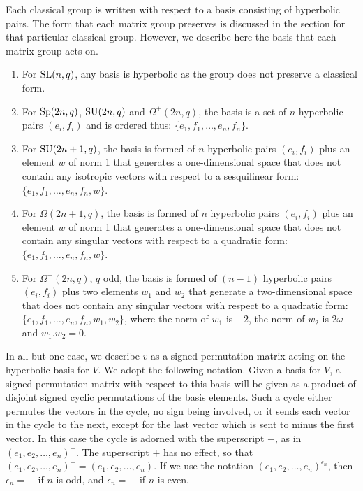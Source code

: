 \documentclass[12pt]{report}
\def\SL{{\rm SL}}
\def\Sp{{\rm Sp}}
\def\SU{{\rm SU}}
\begin{document}
Each classical group is written with respect to a basis consisting of hyperbolic pairs. The form that each matrix group preserves is discussed in the section for that particular classical group. However, we describe here the basis that each matrix group acts on.

\begin{enumerate}
\item For $\SL(n, q)$, any basis is hyperbolic as the group does not preserve a classical form.
\item For $\Sp(2n, q)$, $\SU(2n, q)$ and $\Omega^+(2n, q)$, the basis is a set of $n$ hyperbolic pairs $(e_i, f_i)$ and is ordered thus: $\{e_1, f_1, \ldots, e_n, f_n \}$.
\item For $\SU(2n+1, q)$, the basis is formed of $n$ hyperbolic pairs $(e_i, f_i)$ plus an element $w$ of norm 1 that generates a one-dimensional space that does not contain any isotropic vectors with respect to a sesquilinear form: $\{e_1, f_1, \ldots, e_n, f_n, w \}$.
\item For $\Omega(2n+1, q)$, the basis is formed of $n$ hyperbolic pairs $(e_i, f_i)$ plus an element $w$ of norm 1 that generates a one-dimensional space that does not contain any singular vectors with respect to a quadratic form: $\{e_1, f_1, \ldots, e_n, f_n, w \}$.
\item For $\Omega^-(2n, q)$, $q$ odd, the basis is formed of $(n - 1)$ hyperbolic pairs $(e_i, f_i)$ plus two elements $w_1$ and $w_2$ that generate a two-dimensional space that does not contain any singular vectors with respect to a quadratic form: $\{e_1, f_1, \ldots, e_n, f_n, w_1, w_2 \}$, where the norm of $w_1$ is $-2$, the norm of $w_2$ is $2 \omega$ and $w_1 . w_2 = 0$.
\end{enumerate}

In all but one case, we describe $v$ as a signed permutation matrix acting on the hyperbolic basis for $V$. We adopt the following notation. Given a basis for $V$, a signed permutation matrix with respect to this basis will be given as a product of disjoint signed cyclic permutations of the basis elements. Such a cycle either permutes the vectors in the cycle, no sign being involved, or it sends each vector in the cycle to the next, except for the last vector which is sent to minus the first vector. In this case the cycle is adorned with the superscript $-$, as in $(e_1, e_2, \ldots, e_n)^-$. The superscript $+$ has no effect, so that $(e_1, e_2, \ldots, e_n)^+ = (e_1, e_2, \ldots, e_n)$. If we use the notation $(e_1, e_2, \ldots, e_n)^{\epsilon_n}$, then $\epsilon_n = +$ if $n$ is odd, and $\epsilon_n = -$ if $n$ is even.
\end{document}
